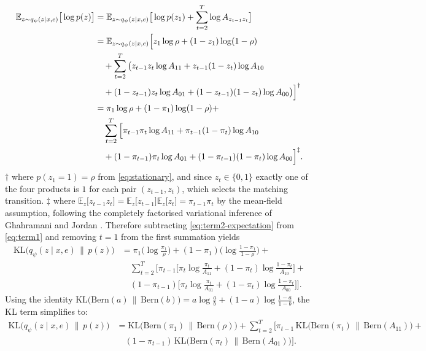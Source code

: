 {\allowdisplaybreaks
\begin{align}
  \mathbb{E}_{z \sim q_\psi(z \mid x,e)}\big[\log p(z)\big] 
  &= \mathbb{E}_{z \sim q_\psi(z \mid x,e)}\big[\log p(z_1) + \sum_{t=2}^{T}\log A_{z_{t-1} z_t}\big] \notag \\
  &= \mathbb{E}_{z \sim q_\psi(z \mid x,e)}\Big[z_1\log \rho + (1-z_1)\log (1 - \rho) \notag \\
  &\quad + \sum_{t=2}^{T}\big(z_{t-1}z_t\log A_{11} + z_{t-1}(1-z_t)\log A_{10} \notag \\
  &\quad + (1-z_{t-1})z_t\log A_{01} + (1-z_{t-1})(1-z_t)\log A_{00}\big)\Big]^\dagger \notag \\
  &= \pi_1\log\rho + (1-\pi_1)\log(1-\rho) + \notag \\
    &\quad \sum_{t=2}^{T}\Big[\pi_{t-1}\pi_t\log A_{11} + \pi_{t-1}(1-\pi_t)\log A_{10} \notag \\
    &\quad + (1-\pi_{t-1})\pi_t\log A_{01}  + (1-\pi_{t-1})(1-\pi_t)\log A_{00}\Big]^\ddagger. \label{eq:term2-expectation}
\end{align}}
$\dagger$ where $p(z_1 = 1) = \rho$ from \eqref{eq:stationary}, and since $z_t \in \{0, 1\}$ exactly one of the four products is $1$ for each pair $(z_{t-1}, z_t)$, which selects the matching transition. $\ddagger$ where $\mathbb{E}_{z}\big[z_{t-1} z_t\big] = \mathbb{E}_{z}\big[z_{t-1}\big]\mathbb{E}_{z}\big[z_{t}\big] = \pi_{t-1} \pi_t$ by the mean-field assumption, following the completely factorised variational inference of Ghahramani and Jordan \cite{ghahramani1997factorial}.
Therefore subtracting \eqref{eq:term2-expectation} from \eqref{eq:term1} and removing $t=1$ from the first summation yields
\begin{equation}
  \begin{aligned}
    \mathrm{KL}\big(q_\psi(z \mid x, e)\,\|\,p(z)\big) &= \pi_1\big(\log \frac{\pi_1}{\rho}\big) + (1-\pi_1)\big(\log \frac{1-\pi_1}{1-\rho}\big) + \\
    &\quad \sum_{t=2}^{T}\Big[\pi_{t-1}\Big[\pi_t\log\frac{\pi_t}{A_{11}} + (1-\pi_t)\log\frac{1-\pi_t}{A_{10}}\Big] + \\
     &\quad (1-\pi_{t-1})\Big[\pi_t\log\frac{\pi_t}{A_{01}} + (1-\pi_t)\log\frac{1-\pi_t}{A_{00}}\Big]\Big].
  \end{aligned}
\end{equation}
Using the identity $\mathrm{KL}\big(\mathrm{Bern}(a)\,\|\,\mathrm{Bern}(b)\big) = a\log\frac{a}{b} + (1-a)\log\frac{1-a}{1-b}$, the KL term simplifies to:
\begin{equation}
  \begin{aligned}
    \mathrm{KL}\big(q_\psi(z \mid x, e)\,\|\,p(z)\big) &= \mathrm{KL}\big(\mathrm{Bern}(\pi_1)\,\|\,\mathrm{Bern}(\rho)\big) + \sum_{t=2}^{T}\Big[\pi_{t-1}\,\mathrm{KL}\big(\mathrm{Bern}(\pi_t)\,\|\,\mathrm{Bern}(A_{11})\big) + \\
    &\quad (1-\pi_{t-1})\,\mathrm{KL}\big(\mathrm{Bern}(\pi_t)\,\|\,\mathrm{Bern}(A_{01})\big)\Big].
    \label{eq:kl-closed-form}
  \end{aligned}
\end{equation}

